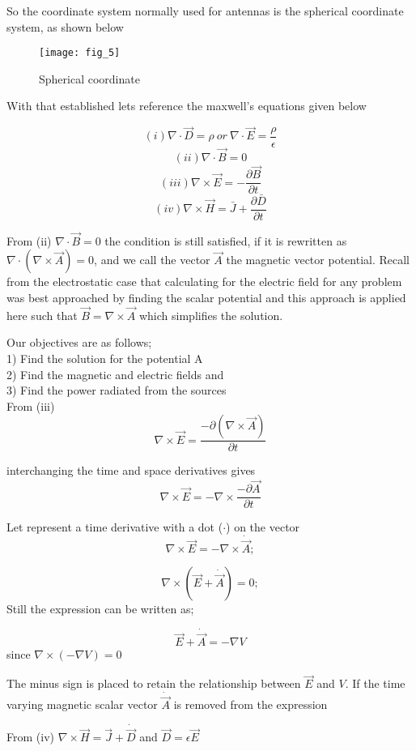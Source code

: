 So the coordinate system normally used for antennas is the spherical coordinate system, as shown below

\begin{figure}
	\centering
	\texttt{[image: fig\_5]}
	\caption{Spherical coordinate}
\end{figure}

With that established lets reference the maxwell's equations given below

$$(i) \nabla\cdot\vec{D} =\rho 
\ or\ \nabla \cdot\vec{E} =\dfrac{\rho}{\epsilon} $$	
$$(ii) \nabla\cdot\vec{B}=0$$	
$$(iii)\nabla\times\vec{E}=- \dfrac{\partial\vec{B}}{\partial t}$$
$$(iv)\nabla\times\vec{H}=\bar{J}+\dfrac{\partial\bar{D}}{\partial t}$$

From (ii) $\nabla\cdot\vec{B}=0$ the condition is still satisfied, if it is rewritten as $\nabla\cdot(\nabla\times\vec{A})=0$, and we call the vector $\vec{A}$ the magnetic vector potential. Recall from the electrostatic case that calculating for the electric field for any problem was best approached by finding the scalar potential and this approach is applied here such that $\vec{B}=\nabla\times\vec{A}$ which simplifies the solution.

Our objectives are as follows;\\
1) Find the solution for the potential A\\
2) Find the magnetic and electric fields and \\
3) Find the power radiated from the sources
\\
From (iii) $$\nabla\times\vec{E}=\dfrac{-\partial(\nabla\times\vec{A})}{\partial t}$$

interchanging the time and space derivatives gives
$$\nabla\times\vec{E}=-\nabla\times\dfrac{-\partial\vec{A}}{\partial t}$$

Let represent a time derivative with a dot ($\cdot$) on the vector
$$\nabla\times\vec{E}=-\nabla\times\dot{\vec{A}};$$

$$\nabla\times(\vec{E}+\dot{\vec{A}})=0;$$ Still the expression can be written as;

$$\vec{E}+\dot{\vec{A}}= -\nabla V$$ since $\nabla\times(-\nabla V)=0$

The minus sign is placed to retain the relationship between $\vec{E}$ and $V$. If the time varying magnetic scalar vector $\dot{\vec{A}}$ is removed from the expression

From (iv)
$\nabla\times\vec{H}=\vec{J}+\dot{\vec{D}}$
and $\vec{D}=\epsilon\vec{E}$

